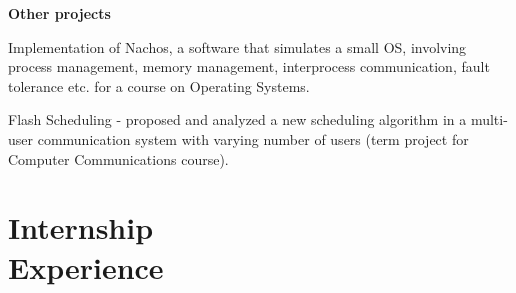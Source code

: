 \documentclass[margin,line]{resume}
\begin{document}
\begin{resume}
  \textbf{Other projects} 
  \begin{list2}   
   \item Implementation of Nachos, a software that simulates a small OS, involving process management, memory management, interprocess communication, fault tolerance etc. for a course on Operating Systems.
   \item Flash Scheduling - proposed and analyzed a new scheduling algorithm in a multi-user communication system with varying number of users (term project for Computer Communications course).
  \end{list2}

 
 \vspace{5mm} 
\section{\mysidestyle Internship\\Experience}




\end{resume}
\end{document}

